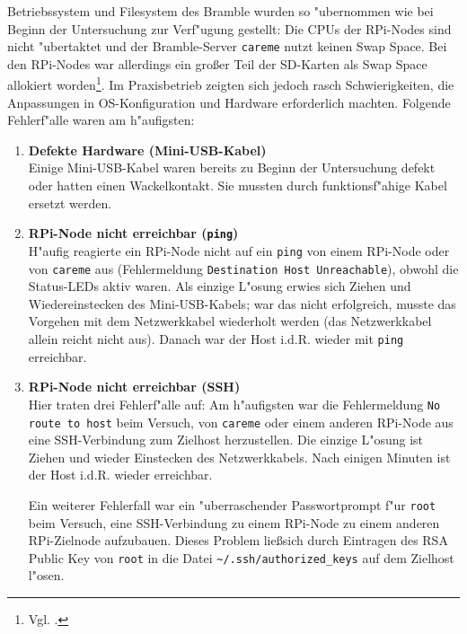 Betriebssystem und Filesystem des Bramble wurden so "ubernommen wie bei Beginn der Untersuchung zur Verf"ugung gestellt: Die CPUs der RPi-Nodes sind nicht "ubertaktet und der Bramble-Server \texttt{careme} nutzt keinen Swap Space. Bei den RPi-Nodes war allerdings ein gro\ss er Teil der SD-Karten als Swap Space allokiert worden\footnote{Vgl. \cite{kli13}.}. Im Praxisbetrieb zeigten sich jedoch rasch Schwierigkeiten, die Anpassungen in OS-Konfiguration und Hardware erforderlich machten. Folgende Fehlerf"alle waren am h"aufigsten: 
\begin{enumerate}
	\item \textbf{Defekte Hardware (Mini-USB-Kabel)}\\
Einige Mini-USB-Kabel waren bereits zu Beginn der Untersuchung defekt oder hatten einen Wackelkontakt. Sie mussten durch funktionsf"ahige Kabel ersetzt werden. 
	\item \textbf{RPi-Node nicht erreichbar (\texttt{ping})}\\
H"aufig reagierte ein RPi-Node nicht auf ein \texttt{ping} von einem RPi-Node oder von \texttt{careme} aus (Fehlermeldung \texttt{Destination Host Unreachable}), obwohl die Status-LEDs aktiv waren. Als einzige L"osung erwies sich Ziehen und Wiedereinstecken des Mini-USB-Kabels; war das nicht erfolgreich, musste das Vorgehen mit dem Netzwerkkabel wiederholt werden (das Netzwerkkabel allein reicht nicht aus). Danach war der Host i.d.R. wieder mit \texttt{ping} erreichbar. 
	\item \textbf{RPi-Node nicht erreichbar (SSH)}\\ 
Hier traten drei Fehlerf"alle auf: Am h"aufigsten war die Fehlermeldung \texttt{No route to host} beim Versuch, von \texttt{careme} oder einem anderen RPi-Node aus eine SSH-Verbindung zum Zielhost herzustellen. Die einzige L"osung ist Ziehen und wieder Einstecken des Netzwerkkabels. Nach einigen Minuten ist der Host i.d.R. wieder erreichbar. 

Ein weiterer Fehlerfall war ein "uberraschender Passwortprompt f"ur \texttt{root} beim Versuch, eine SSH-Verbindung zu einem RPi-Node zu einem anderen RPi-Zielnode aufzubauen. Dieses Problem lie\ss sich durch Eintragen des RSA Public Key von 
\texttt{root} in die Datei \texttt{\textasciitilde/.ssh/authorized\_keys} auf dem Zielhost l"osen. 


\end{enumerate}

